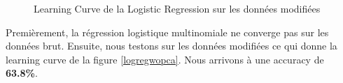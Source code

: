 \documentclass[12pt,a4paper]{article}
\numberwithin{equation}{section}
\begin{document}
	\begin{figure}
		\centering
	\hfill
		\caption{Learning Curve de la Logistic Regression sur les données modifiées}
	\end{figure}
	
	Premièrement, la régression logistique multinomiale ne converge pas sur les données brut. Ensuite, nous testons sur les données modifiées ce qui donne la learning curve de la figure \ref{logregwopca}. Nous arrivons à une accuracy de \textbf{63.8\%}. \\
	
\end{document}
